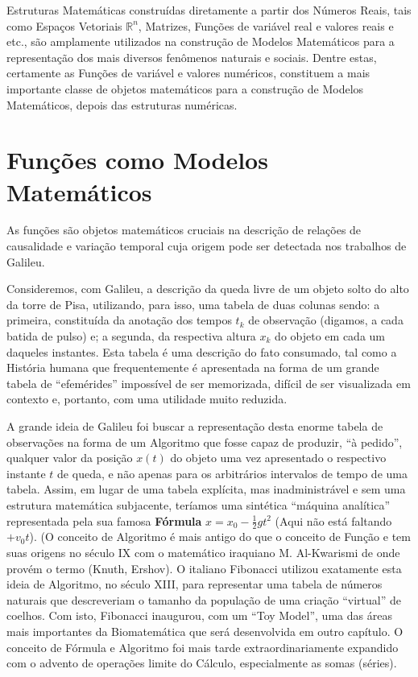     Estruturas Matemáticas construídas diretamente a partir dos Números Reais, tais como Espaços Vetoriais \(\mathbb{R}^n\), Matrizes, Funções de variável real e valores reais e etc., são amplamente utilizados na construção de Modelos Matemáticos para a representação dos mais diversos fenômenos naturais e sociais. Dentre estas, certamente as Funções de variável e valores numéricos, constituem a mais importante classe de objetos matemáticos para a construção de Modelos Matemáticos, depois das estruturas numéricas.




\section{Funções como Modelos Matemáticos}

    As funções são objetos matemáticos cruciais na descrição de relações de causalidade e variação temporal cuja origem pode ser detectada nos trabalhos de Galileu.

    Consideremos, com Galileu, a descrição da queda livre de um objeto solto do alto da torre de Pisa, utilizando, para isso, uma tabela de duas colunas sendo: a primeira, constituída da anotação dos tempos \(t_k\) de observação (digamos, a cada batida de pulso) e; a segunda, da respectiva altura \(x_k\) do objeto em cada um daqueles instantes. Esta tabela é uma descrição do fato consumado, tal como a História humana que frequentemente é apresentada na forma de um grande tabela de ``efemérides'' impossível de ser memorizada, difícil de ser visualizada em contexto e, portanto, com uma utilidade muito reduzida.

    A grande ideia de Galileu foi buscar a representação desta enorme tabela de observações na forma de um Algoritmo que fosse capaz de produzir, ``à pedido'', qualquer valor da posição \(x(t)\) do objeto uma vez apresentado o respectivo instante \(t\) de queda, e não apenas para os arbitrários intervalos de tempo de uma tabela. Assim, em lugar de uma tabela explícita, mas inadministrável e sem uma estrutura matemática subjacente, teríamos uma sintética ``máquina analítica'' representada pela sua famosa \textbf{Fórmula} \(x = x_0 - \frac{1}{2}gt^2\) {\red (Aqui não está faltando \(+v_0t\))}. (O conceito de Algoritmo é mais antigo do que o conceito de Função e tem suas origens no século IX com o matemático iraquiano M. Al-Kwarismi de onde provém o termo (Knuth, Ershov). O italiano Fibonacci utilizou exatamente esta ideia de Algoritmo, no século XIII, para representar uma tabela de números naturais que descreveriam o tamanho da população de uma criação ``virtual'' de coelhos. Com isto, Fibonacci inaugurou, com um ``Toy Model'', uma das áreas mais importantes da Biomatemática que será desenvolvida em outro capítulo. O conceito de Fórmula e Algoritmo foi mais tarde extraordinariamente expandido com o advento de operações limite do Cálculo, especialmente as somas (séries).

